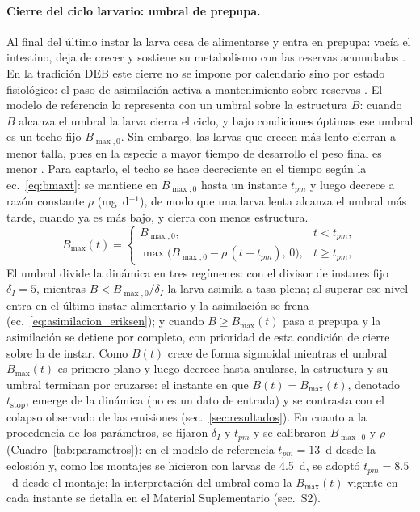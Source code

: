 \paragraph{Cierre del ciclo larvario: umbral de prepupa.}
Al final del último instar la larva cesa de alimentarse y entra en prepupa: vacía el intestino, deja de crecer y sostiene su metabolismo con las reservas acumuladas \parencite{arreseInsectFatBody2010,nayakHermetiaIllucensDiptera2023}. En la tradición DEB este cierre no se impone por calendario sino por estado fisiológico: el paso de asimilación activa a mantenimiento sobre reservas \parencite{kooijmanDynamicEnergyBudget2009,llandresDynamicEnergyBudget2015}. El modelo de referencia lo representa con un umbral sobre la estructura $B$: cuando $B$ alcanza el umbral la larva cierra el ciclo, y bajo condiciones óptimas ese umbral es un techo fijo $B_{\max,0}$. Sin embargo, las larvas que crecen más lento cierran a menor talla, pues en la especie a mayor tiempo de desarrollo el peso final es menor \parencite{eriksenDynamicModellingFeed2022}. Para captarlo, el techo se hace decreciente en el tiempo según la ec.~\ref{eq:bmaxt}: se mantiene en $B_{\max,0}$ hasta un instante $t_{pm}$ y luego decrece a razón constante $\rho$ (mg~d$^{-1}$), de modo que una larva lenta alcanza el umbral más tarde, cuando ya es más bajo, y cierra con menos estructura.
\begin{equation}
B_{\max}(t) =
\begin{cases}
B_{\max,0}, & t < t_{pm},\\[2pt]
\max\!\big(B_{\max,0} - \rho\,(t - t_{pm}),\, 0\big), & t \ge t_{pm},
\end{cases}
\label{eq:bmaxt}
\end{equation}
El umbral divide la dinámica en tres regímenes: con el divisor de instares fijo $\delta_I = 5$, mientras $B < B_{\max,0}/\delta_I$ la larva asimila a tasa plena; al superar ese nivel entra en el último instar alimentario y la asimilación se frena (ec.~\ref{eq:asimilacion_eriksen}); y cuando $B \ge B_{\max}(t)$ pasa a prepupa y la asimilación se detiene por completo, con prioridad de esta condición de cierre sobre la de instar. Como $B(t)$ crece de forma sigmoidal mientras el umbral $B_{\max}(t)$ es primero plano y luego decrece hasta anularse, la estructura y su umbral terminan por cruzarse: el instante en que $B(t) = B_{\max}(t)$, denotado $t_{\mathrm{stop}}$, emerge de la dinámica (no es un dato de entrada) y se contrasta con el colapso observado de las emisiones (sec.~\ref{sec:resultados}). En cuanto a la procedencia de los parámetros, se fijaron $\delta_I$ y $t_{pm}$ y se calibraron $B_{\max,0}$ y $\rho$ (Cuadro~\ref{tab:parametros}): en el modelo de referencia $t_{pm} = 13$~d desde la eclosión y, como los montajes se hicieron con larvas de 4.5~d, se adoptó $t_{pm} = 8.5$~d desde el montaje; la interpretación del umbral como la $B_{\max}(t)$ vigente en cada instante se detalla en el Material Suplementario (sec.~S2).

